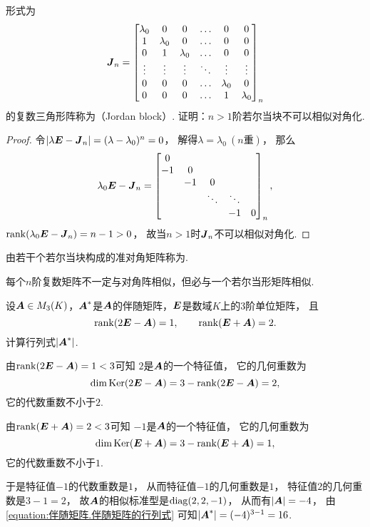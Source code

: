 \begin{example}
形式为\[
	\boldsymbol{J}_n = \begin{bmatrix}
		\lambda_0 & 0 & 0 & \dots & 0 & 0 \\
		1 & \lambda_0 & 0 & \dots & 0 & 0 \\
		0 & 1 & \lambda_0 & \dots & 0 & 0 \\
		\vdots & \vdots & \vdots & \ddots & \vdots & \vdots \\
		0 & 0 & 0 & \dots & \lambda_0 & 0 \\
		0 & 0 & 0 & \dots & 1 & \lambda_0
	\end{bmatrix}_n
\]的复数三角形阵称为（Jordan block）.
证明：\(n>1\)阶若尔当块不可以相似对角化.
\begin{proof}
令\(\abs{\lambda\boldsymbol{E}-\boldsymbol{J}_n}=(\lambda-\lambda_0)^n=0\)，
解得\(\lambda=\lambda_0\ (\text{$n$重})\)，
那么\[
	\lambda_0\boldsymbol{E}-\boldsymbol{J}_n = \begin{bmatrix}
		0 \\
		-1 & 0 \\
		& -1 & 0 \\
		& & \ddots & \ddots \\
		& & & -1 & 0
	\end{bmatrix}_n,
\]
\(\rank(\lambda_0\boldsymbol{E}-\boldsymbol{J}_n)=n-1 > 0\)，
故当\(n>1\)时\(\boldsymbol{J}_n\)不可以相似对角化.
\end{proof}
\end{example}

\begin{definition}
由若干个若尔当块构成的准对角矩阵称为.
\end{definition}

\begin{theorem}
每个\(n\)阶复数矩阵不一定与对角阵相似，但必与一个若尔当形矩阵相似.
\end{theorem}

\begin{example}
设\(\boldsymbol{A} \in M_3(K)\)，\(\boldsymbol{A}^*\)是\(\boldsymbol{A}\)的伴随矩阵，\(\boldsymbol{E}\)是数域\(K\)上的3阶单位矩阵，
且\[
	\rank(2\boldsymbol{E}-\boldsymbol{A}) = 1,
	\qquad
	\rank(\boldsymbol{E}+\boldsymbol{A}) = 2.
\]
计算行列式\(\abs{\boldsymbol{A}^*}\).
\begin{solution}
由\(\rank(2\boldsymbol{E}-\boldsymbol{A}) = 1 < 3\)可知
\(2\)是\(\boldsymbol{A}\)的一个特征值，
它的几何重数为\[
	\dim\operatorname{Ker}(2\boldsymbol{E}-\boldsymbol{A})
	= 3 - \rank(2\boldsymbol{E}-\boldsymbol{A})
	= 2,
\]
它的代数重数不小于\(2\).

由\(\rank(\boldsymbol{E}+\boldsymbol{A}) = 2 < 3\)可知
\(-1\)是\(\boldsymbol{A}\)的一个特征值，
它的几何重数为\[
	\dim\operatorname{Ker}(\boldsymbol{E}+\boldsymbol{A})
	= 3 - \rank(\boldsymbol{E}+\boldsymbol{A})
	= 1,
\]
它的代数重数不小于\(1\).

于是特征值\(-1\)的代数重数是\(1\)，
从而特征值\(-1\)的几何重数是\(1\)，
特征值\(2\)的几何重数是\(3-1=2\)，
故\(\boldsymbol{A}\)的相似标准型是\(\operatorname{diag}(2,2,-1)\)，
从而有\(\abs{\boldsymbol{A}} = -4\)，
由\cref{equation:伴随矩阵.伴随矩阵的行列式}
可知\(\abs{\boldsymbol{A}^*} = (-4)^{3-1} = 16\).
\end{solution}
\end{example}
